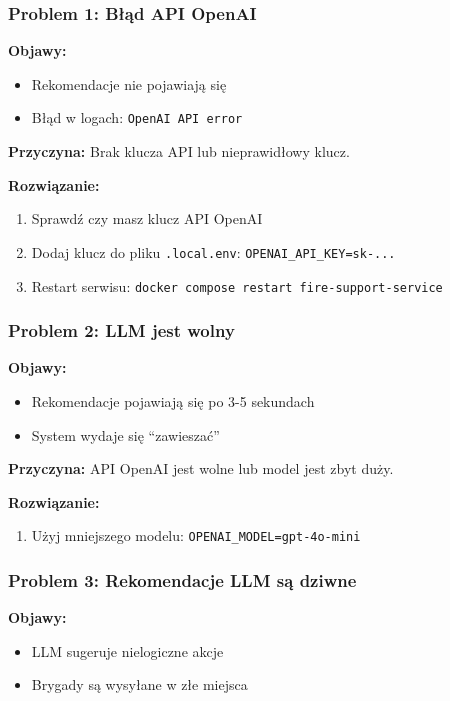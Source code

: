 \subsubsection{Problem 1: Błąd API OpenAI}

\textbf{Objawy:}
\begin{itemize}
    \item Rekomendacje nie pojawiają się
    \item Błąd w logach: \texttt{OpenAI API error}
\end{itemize}

\textbf{Przyczyna:} Brak klucza API lub nieprawidłowy klucz.

\textbf{Rozwiązanie:}
\begin{enumerate}
    \item Sprawdź czy masz klucz API OpenAI
    \item Dodaj klucz do pliku \texttt{.local.env}: \texttt{OPENAI\_API\_KEY=sk-...}
    \item Restart serwisu: \texttt{docker compose restart fire-support-service}
\end{enumerate}

\subsubsection{Problem 2: LLM jest wolny}

\textbf{Objawy:}
\begin{itemize}
    \item Rekomendacje pojawiają się po 3-5 sekundach
    \item System wydaje się ``zawieszać''
\end{itemize}

\textbf{Przyczyna:} API OpenAI jest wolne lub model jest zbyt duży.

\textbf{Rozwiązanie:}
\begin{enumerate}
    \item Użyj mniejszego modelu: \texttt{OPENAI\_MODEL=gpt-4o-mini}
\end{enumerate}

\subsubsection{Problem 3: Rekomendacje LLM są dziwne}

\textbf{Objawy:}
\begin{itemize}
    \item LLM sugeruje nielogiczne akcje
    \item Brygady są wysyłane w złe miejsca
\end{itemize}

